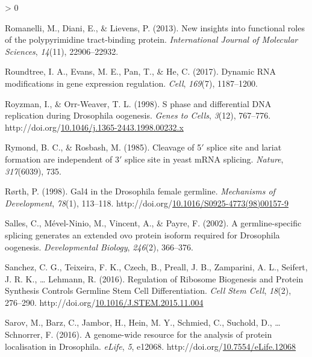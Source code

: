 \documentclass[12pt,oneside]{reedthesis}
\newlength{\cslhangindent}
\newenvironment{CSLReferences}[2] %
 {%
  \setlength{\parindent}{0pt}
  \ifodd #1 \everypar{\setlength{\hangindent}{\cslhangindent}}\ignorespaces\fi
  \ifnum #2 > 0
  \setlength{\parskip}{#2\baselineskip}
  \fi
 }%
 {}
\begin{document}
\begin{CSLReferences}{1}{0}
\leavevmode\hypertarget{ref-Romanelli2013}{}%
Romanelli, M., Diani, E., \& Lievens, P. (2013). New insights into functional roles of the polypyrimidine tract-binding protein. \emph{International Journal of Molecular Sciences}, \emph{14}(11), 22906--22932.

\leavevmode\hypertarget{ref-Roundtree2017}{}%
Roundtree, I. A., Evans, M. E., Pan, T., \& He, C. (2017). Dynamic {RNA} modifications in gene expression regulation. \emph{Cell}, \emph{169}(7), 1187--1200.

\leavevmode\hypertarget{ref-Royzman1998}{}%
Royzman, I., \& Orr-Weaver, T. L. (1998). S phase and differential {DNA} replication during {Drosophila} oogenesis. \emph{Genes to Cells}, \emph{3}(12), 767--776. http://doi.org/\href{https://doi.org/10.1046/j.1365-2443.1998.00232.x}{10.1046/j.1365-2443.1998.00232.x}

\leavevmode\hypertarget{ref-Rymond1985}{}%
Rymond, B. C., \& Rosbash, M. (1985). Cleavage of 5{\({'}\)} splice site and lariat formation are independent of 3{\({'}\)} splice site in yeast {mRNA} splicing. \emph{Nature}, \emph{317}(6039), 735.

\leavevmode\hypertarget{ref-rorthGal4DrosophilaFemale1998}{}%
Rørth, P. (1998). Gal4 in the {Drosophila} female germline. \emph{Mechanisms of Development}, \emph{78}(1), 113--118. http://doi.org/\href{https://doi.org/10.1016/S0925-4773(98)00157-9}{10.1016/S0925-4773(98)00157-9}

\leavevmode\hypertarget{ref-Salles2002}{}%
Salles, C., Mével-Ninio, M., Vincent, A., \& Payre, F. (2002). A germline-specific splicing generates an extended ovo protein isoform required for {Drosophila} oogenesis. \emph{Developmental Biology}, \emph{246}(2), 366--376.

\leavevmode\hypertarget{ref-Sanchez2016h}{}%
Sanchez, C. G., Teixeira, F. K., Czech, B., Preall, J. B., Zamparini, A. L., Seifert, J. R. K., \ldots{} Lehmann, R. (2016). Regulation of {Ribosome Biogenesis} and {Protein Synthesis Controls Germline Stem Cell Differentiation}. \emph{Cell Stem Cell}, \emph{18}(2), 276--290. http://doi.org/\href{https://doi.org/10.1016/J.STEM.2015.11.004}{10.1016/J.STEM.2015.11.004}

\leavevmode\hypertarget{ref-sarovGenomewideResourceAnalysis2016}{}%
Sarov, M., Barz, C., Jambor, H., Hein, M. Y., Schmied, C., Suchold, D., \ldots{} Schnorrer, F. (2016). A genome-wide resource for the analysis of protein localisation in {Drosophila}. \emph{eLife}, \emph{5}, e12068. http://doi.org/\href{https://doi.org/10.7554/eLife.12068}{10.7554/eLife.12068}


\end{CSLReferences}
\end{document}
